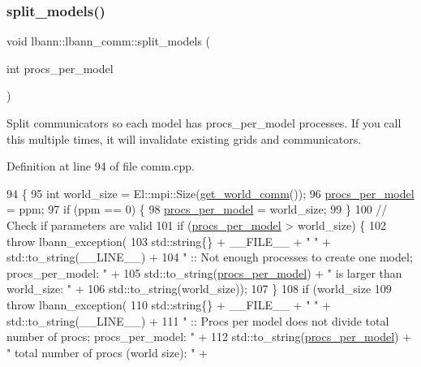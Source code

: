 \subsubsection{\texorpdfstring{split\+\_\+models()}{split\_models()}}
{\footnotesize\ttfamily void lbann\+::lbann\+\_\+comm\+::split\+\_\+models (\begin{DoxyParamCaption}\item[{int}]{procs\+\_\+per\+\_\+model }\end{DoxyParamCaption})}

Split communicators so each model has procs\+\_\+per\+\_\+model processes. If you call this multiple times, it will invalidate existing grids and communicators. 

Definition at line 94 of file comm.\+cpp.


\begin{DoxyCode}
94                                      \{
95   \textcolor{keywordtype}{int} world\_size = El::mpi::Size(\hyperlink{classlbann_1_1lbann__comm_a0493f1f0c42b95674daacf5288fdb073}{get\_world\_comm}());
96   \hyperlink{classlbann_1_1lbann__comm_a7cb55d127259d7ed9f07ccde6f4ebd8c}{procs\_per\_model} = ppm;
97   \textcolor{keywordflow}{if} (ppm == 0) \{
98     \hyperlink{classlbann_1_1lbann__comm_a7cb55d127259d7ed9f07ccde6f4ebd8c}{procs\_per\_model} = world\_size;
99   \}
100   \textcolor{comment}{// Check if parameters are valid}
101   \textcolor{keywordflow}{if} (\hyperlink{classlbann_1_1lbann__comm_a7cb55d127259d7ed9f07ccde6f4ebd8c}{procs\_per\_model} > world\_size) \{
102     \textcolor{keywordflow}{throw} lbann\_exception(
103       std::string\{\} + \_\_FILE\_\_ + \textcolor{stringliteral}{" "} + std::to\_string(\_\_LINE\_\_) +
104       \textcolor{stringliteral}{" :: Not enough processes to create one model; procs\_per\_model: "} +
105       std::to\_string(\hyperlink{classlbann_1_1lbann__comm_a7cb55d127259d7ed9f07ccde6f4ebd8c}{procs\_per\_model}) + \textcolor{stringliteral}{" is larger than world\_size: "} +
106       std::to\_string(world\_size));
107   \}
108   \textcolor{keywordflow}{if} (world\_size %
109     \textcolor{keywordflow}{throw} lbann\_exception(
110       std::string\{\} + \_\_FILE\_\_ + \textcolor{stringliteral}{" "} + std::to\_string(\_\_LINE\_\_) +
111       \textcolor{stringliteral}{" :: Procs per model does not divide total number of procs; procs\_per\_model: "} +
112       std::to\_string(\hyperlink{classlbann_1_1lbann__comm_a7cb55d127259d7ed9f07ccde6f4ebd8c}{procs\_per\_model}) + \textcolor{stringliteral}{" total number of procs (world size): "} +

\end{DoxyCode}
